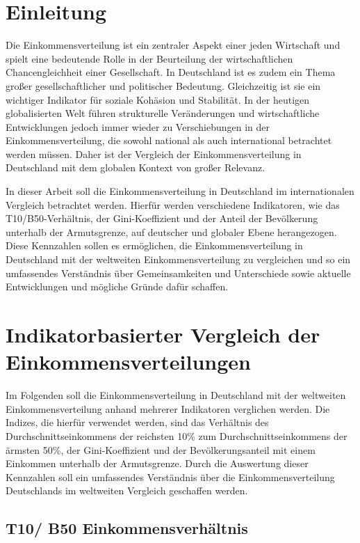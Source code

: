 \chapter{Einleitung}

Die Einkommensverteilung ist ein zentraler Aspekt einer jeden Wirtschaft und spielt eine bedeutende Rolle in der Beurteilung der wirtschaftlichen Chancengleichheit einer Gesellschaft. In Deutschland ist es zudem ein Thema gro{\ss}er gesellschaftlicher und politischer Bedeutung. Gleichzeitig ist sie ein wichtiger Indikator für soziale Kohäsion und Stabilität. In der heutigen globalisierten Welt führen strukturelle Veränderungen und wirtschaftliche Entwicklungen jedoch immer wieder zu Verschiebungen in der Einkommensverteilung, die sowohl national als auch international betrachtet werden müssen. Daher ist der Vergleich der Einkommensverteilung in Deutschland mit dem globalen Kontext von gro{\ss}er Relevanz.

In dieser Arbeit soll die Einkommensverteilung in Deutschland im internationalen Vergleich betrachtet werden. Hierfür werden verschiedene Indikatoren, wie das T10/B50-Verhältnis, der Gini-Koeffizient und der Anteil der Bevölkerung unterhalb der Armutsgrenze, auf deutscher und globaler Ebene herangezogen. Diese Kennzahlen sollen es ermöglichen, die Einkommensverteilung in Deutschland mit der weltweiten Einkommensverteilung zu vergleichen und so ein umfassendes Verständnis über Gemeinsamkeiten und Unterschiede sowie aktuelle Entwicklungen und mögliche Gründe dafür schaffen.

\chapter{Indikatorbasierter Vergleich der Einkommensverteilungen}

Im Folgenden soll die Einkommensverteilung in Deutschland mit der weltweiten Einkommensverteilung anhand mehrerer Indikatoren verglichen werden. Die Indizes, die hierfür verwendet werden, sind das Verhältnis des Durchschnittseinkommens der reichsten 10\% zum Durchschnittseinkommens der ärmsten 50\%, der Gini-Koeffizient und der Bevölkerungsanteil mit einem Einkommen unterhalb der Armutsgrenze. Durch die Auswertung dieser Kennzahlen soll ein umfassendes Verständnis über die Einkommensverteilung Deutschlands im weltweiten Vergleich geschaffen werden.

\section{T10/ B50 Einkommensverhältnis}

